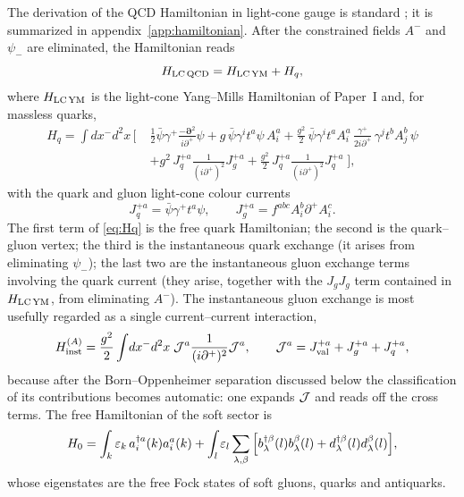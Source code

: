 The derivation of the QCD Hamiltonian in light-cone gauge is standard
\cite{Brodsky:1997de,Zhang:1993dd,Kogut:1969xa,Lublinsky:2016meo}; it is summarized in
appendix~\ref{app:hamiltonian}. After the constrained fields $A^{-}$ and $\psi_{-}$ are eliminated,
the Hamiltonian reads
\begin{equation}
H_{\rm LC\,QCD}=H_{\rm LC\,YM}+H_{q},
\label{eq:HQCD}
\end{equation}
where $H_{\rm LC\,YM}$ is the light-cone Yang--Mills Hamiltonian of Paper~I and, for massless
quarks,
\begin{align}
H_{q}=\int\!dx^{-}d^{2}x\,\Big[\;&\frac{1}{2}\bar\psi\gamma^{+}\frac{-\bm\partial^{2}}{i\partial^{+}}\psi
+g\,\bar\psi\gamma^{i}t^{a}\psi\,A^{a}_{i}
+\frac{g^{2}}{2}\,\bar\psi\gamma^{i}t^{a}A^{a}_{i}\,\frac{\gamma^{+}}{2i\partial^{+}}\,
\gamma^{j}t^{b}A^{b}_{j}\,\psi
\nonumber\\
&+g^{2}\,J^{+a}_{q}\frac{1}{(i\partial^{+})^{2}}J^{+a}_{g}
+\frac{g^{2}}{2}\,J^{+a}_{q}\frac{1}{(i\partial^{+})^{2}}J^{+a}_{q}\;\Big],
\label{eq:Hq}
\end{align}
with the quark and gluon light-cone colour currents
\begin{equation}
J^{+a}_{q}=\bar\psi\gamma^{+}t^{a}\psi,\qquad J^{+a}_{g}=f^{abc}A^{b}_{i}\partial^{+}A^{c}_{i}.
\label{eq:currents}
\end{equation}
The first term of \eqref{eq:Hq} is the free quark Hamiltonian; the second is the quark--gluon
vertex; the third is the instantaneous quark exchange (it arises from eliminating $\psi_{-}$);
the last two are the instantaneous gluon exchange terms involving the quark current (they
arise, together with the $J_{g}J_{g}$ term contained in $H_{\rm LC\,YM}$, from eliminating
$A^{-}$). The instantaneous gluon exchange is most usefully regarded as a single current--current
interaction,
\begin{equation}
H^{(A)}_{\rm inst}=\frac{g^{2}}{2}\int\!dx^{-}d^{2}x\;\mathcal{J}^{a}\frac{1}{(i\partial^{+})^{2}}\mathcal{J}^{a},
\qquad \mathcal{J}^{a}=J^{+a}_{\rm val}+J^{+a}_{g}+J^{+a}_{q},
\label{eq:HinstA}
\end{equation}
because after the Born--Oppenheimer separation discussed below the classification of its
contributions becomes automatic: one expands $\mathcal{J}$ and reads off the cross terms. The free
Hamiltonian of the soft sector is
\begin{equation}
H_{0}=\int_{k}\varepsilon_{k}\,a^{\dagger a}_{i}(k)a^{a}_{i}(k)
+\int_{l}\varepsilon_{l}\sum_{\lambda,\beta}\Big[b^{\dagger\beta}_{\lambda}(l)b^{\beta}_{\lambda}(l)
+d^{\dagger\beta}_{\lambda}(l)d^{\beta}_{\lambda}(l)\Big],
\label{eq:H0}
\end{equation}
whose eigenstates are the free Fock states of soft gluons, quarks and antiquarks.

